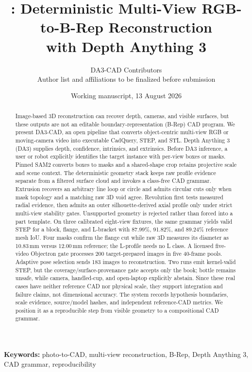 \documentclass[10pt]{article}
\title{\system: Deterministic Multi-View RGB-to-B-Rep Reconstruction\\with Depth Anything 3}
\author{DA3-CAD Contributors\\\small Author list and affiliations to be finalized before submission}
\date{Working manuscript, 13 August 2026}
\newcommand{\system}{DA3-CAD}
\begin{document}
\maketitle

\begin{abstract}
Image-based 3D reconstruction can recover depth, cameras, and visible surfaces,
but these outputs are not an editable boundary-representation (B-Rep) CAD
program.  We present \system, an open pipeline that converts object-centric
multi-view RGB or moving-camera video into executable CadQuery, STEP, and STL.
Depth Anything 3 (DA3) supplies depth, confidence, intrinsics, and extrinsics.
Before DA3 inference, a user or robot explicitly identifies the target instance
with per-view boxes or masks.  Pinned SAM2 converts boxes to masks and a
shared-shape crop retains projective scale and scene context.  The deterministic
geometry stack keeps raw profile evidence separate from a filtered surface cloud
and invokes a class-free CAD grammar.  Extrusion recovers an arbitrary line loop
or circle and admits circular cuts only when mask topology and a matching raw 3D
void agree.  Revolution first tests measured radial evidence, then admits an
outer silhouette-derived axial profile only under strict multi-view stability
gates.  Unsupported geometry is rejected rather than forced into a part
template.  On
three calibrated eight-view fixtures, the same grammar yields valid STEP for a
block, flange, and L-bracket with 87.99\%, 91.82\%, and 89.24\% reference mesh
IoU.  Four masks confirm the flange cut while raw 3D measures its diameter as
10.83\,mm versus 12.00\,mm reference; the L-profile needs no L class.  A licensed
five-video Objectron gate processes 200 target-prepared images in five
40-frame pools.  Adaptive pose selection sends 183 images to reconstruction.
Two runs emit kernel-valid STEP, but the coverage/surface-provenance gate
accepts only the book; bottle remains unsafe, while camera, handled-cup, and
open-laptop explicitly abstain.  Since these real cases have neither reference CAD
nor physical scale, they support integration and failure claims, not dimensional
accuracy.  The system records hypothesis boundaries, scale evidence,
source/model hashes, and independent reference-CAD metrics.  We position it as
a reproducible step from visible geometry to a compositional CAD grammar.
\end{abstract}

\noindent\textbf{Keywords:} photo-to-CAD, multi-view reconstruction, B-Rep,
Depth Anything 3, CAD grammar, reproducibility
\end{document}
